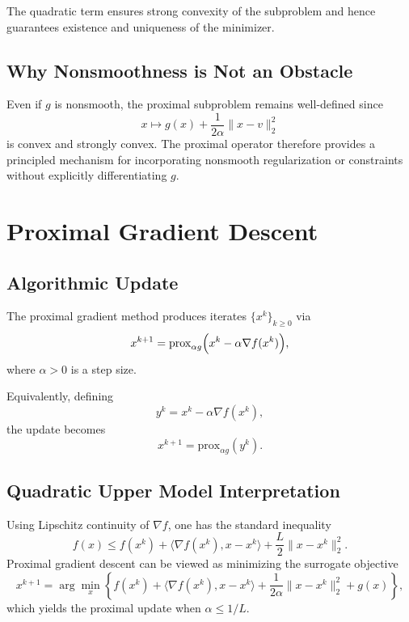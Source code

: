 \documentclass[11pt]{article}
\begin{document}
The quadratic term ensures strong convexity of the subproblem and hence guarantees existence and uniqueness of the minimizer.

\subsection{Why Nonsmoothness is Not an Obstacle}

Even if $g$ is nonsmooth, the proximal subproblem remains well-defined since
\begin{equation}
x \mapsto g(x) + \frac{1}{2\alpha}\|x-v\|_2^2
\end{equation}
is convex and strongly convex. The proximal operator therefore provides a principled mechanism for incorporating nonsmooth regularization or constraints without explicitly differentiating $g$.

\section{Proximal Gradient Descent}

\subsection{Algorithmic Update}

The proximal gradient method produces iterates $\{x^k\}_{k\ge 0}$ via
\begin{equation}
x^{k+1}
=
\mathrm{prox}_{\alpha g}\Bigl(x^k - \alpha \nabla f(x^k)\Bigr),
\end{equation}
where $\alpha>0$ is a step size.

Equivalently, defining
\begin{equation}
y^k = x^k - \alpha \nabla f(x^k),
\end{equation}
the update becomes
\begin{equation}
x^{k+1} = \mathrm{prox}_{\alpha g}(y^k).
\end{equation}

\subsection{Quadratic Upper Model Interpretation}

Using Lipschitz continuity of $\nabla f$, one has the standard inequality
\begin{equation}
f(x) \le f(x^k) + \langle \nabla f(x^k), x-x^k\rangle + \frac{L}{2}\|x-x^k\|_2^2.
\end{equation}
Proximal gradient descent can be viewed as minimizing the surrogate objective
\begin{equation}
x^{k+1}
=
\arg\min_x
\left\{
f(x^k) + \langle \nabla f(x^k), x-x^k\rangle
+ \frac{1}{2\alpha}\|x-x^k\|_2^2
+ g(x)
\right\},
\end{equation}
which yields the proximal update when $\alpha \le 1/L$.
\end{document}
